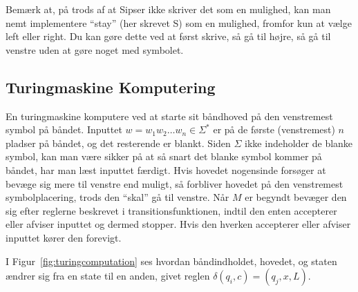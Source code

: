 Bemærk at, på trods af at Sipser ikke skriver det som en mulighed, kan man nemt implementere ``stay'' (her skrevet S) som en mulighed, fromfor kun at vælge left eller right. Du kan gøre dette ved at først skrive, så gå til højre, så gå til venstre uden at gøre noget med symbolet.


\subsection{Turingmaskine Komputering}%
\label{subsec:turingmaskinekomputering}

En turingmaskine komputere ved at starte sit båndhoved på den venstremest symbol på båndet. Inputtet $w = w_{1}w_{2} \ldots w_{n} \in \Sigma^{*}$ er på de første (venstremest) $n$ pladser på båndet, og det resterende er blankt. Siden $\Sigma$ ikke indeholder de blanke symbol, kan man være sikker på at så snart det blanke symbol kommer på båndet, har man læst inputtet færdigt. Hvis hovedet nogensinde forsøger at bevæge sig mere til venstre end muligt, så forbliver hovedet på den venstremest symbolplacering, trods den ``skal'' gå til venstre. Når $M$ er begyndt bevæger den sig efter reglerne beskrevet i transitionsfunktionen, indtil den enten accepterer eller afviser inputtet og dermed stopper. Hvis den hverken accepterer eller afviser inputtet kører den forevigt.


I Figur~\ref{fig:turingcomputation} ses hvordan båndindholdet, hovedet, og staten ændrer sig fra en state til en anden, givet reglen $\delta(q_{i}, c) = (q_{j}, x, L)$.

